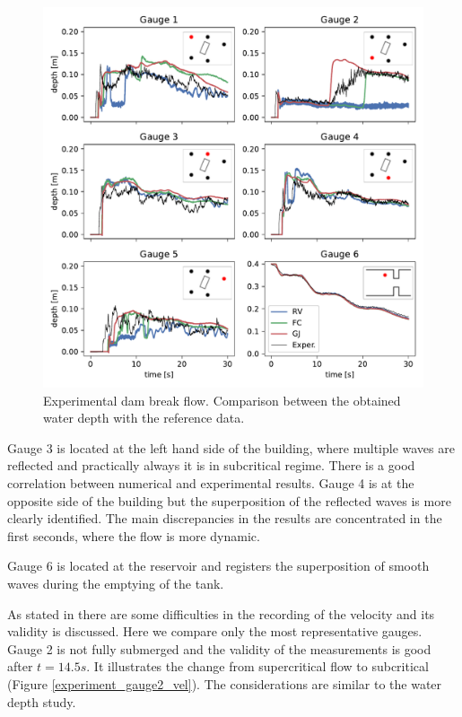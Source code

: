\begin{figure}
\centering
\includegraphics[width=\textwidth]{img/eulerian/exp/gauges.pdf}
\caption{Experimental dam break flow. Comparison between the obtained water depth with the reference data.}
\label{experiment_gauges}
\end{figure}

Gauge 3 is located at the left hand side of the building, where multiple waves are reflected and practically always it is in subcritical regime. There is a good correlation between numerical and experimental results. Gauge 4 is at the opposite side of the building but the superposition of the reflected waves is more clearly identified. The main discrepancies in the results are concentrated in the first seconds, where the flow is more dynamic.

Gauge 6 is located at the reservoir and registers the superposition of smooth waves during the emptying of the tank.

As stated in \cite{soares2007} there are some difficulties in the recording of the velocity and its validity is discussed. Here we compare only the most representative gauges. Gauge 2 is not fully submerged and the validity of the measurements is good after $t=14.5s$. It illustrates the change from supercritical flow to subcritical (Figure \ref{experiment_gauge2_vel}). The considerations are similar to the water depth study.


